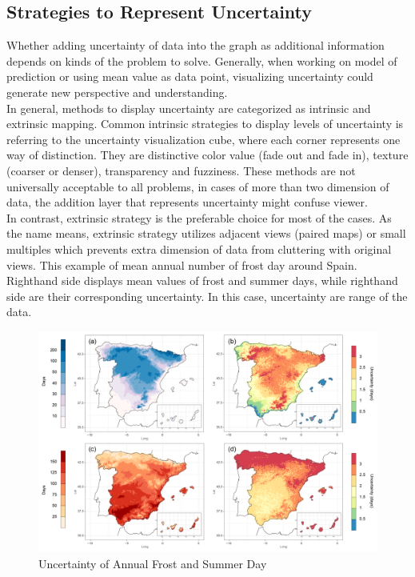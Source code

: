 \documentclass[11pt,letterpaper]{article}
\begin{document}
\subsection*{Strategies to Represent Uncertainty}
Whether adding uncertainty of data into the graph as additional information depends on kinds of the problem to solve. Generally, when working on model of prediction or using mean value as data point, visualizing uncertainty could generate new perspective and understanding. \\

In general, methods to display uncertainty are categorized as intrinsic and extrinsic mapping. Common intrinsic strategies to display levels of uncertainty is referring to the uncertainty visualization cube, where each corner represents one way of distinction. They are distinctive color value (fade out and fade in), texture (coarser or denser), transparency and fuzziness. These methods are not universally acceptable to all problems, in cases of more than two dimension of data, the addition layer that represents uncertainty might confuse viewer.  \\

In contrast, extrinsic strategy is the preferable choice for most of the cases. As the name means, extrinsic strategy utilizes adjacent views (paired maps) or small multiples which prevents extra dimension of data from cluttering with original views. This example of mean annual number of frost day around Spain. Righthand side displays mean values of frost and summer days, while righthand side are their corresponding uncertainty. In this case, uncertainty are range of the data. \\

\begin{figure}
\includegraphics[width=6in]{uncertainty-2.png}
\caption{Uncertainty of Annual Frost and Summer Day}
\end{figure}
\end{document}

